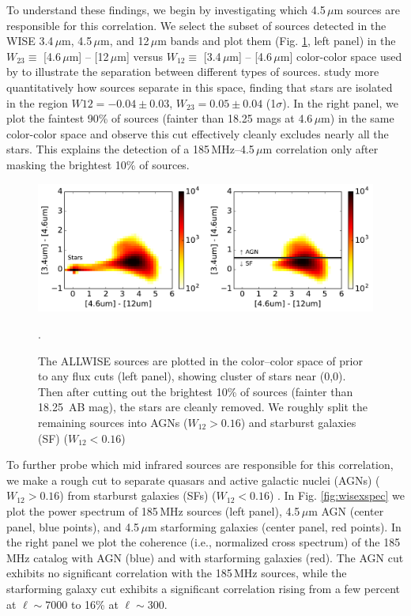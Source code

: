 \documentclass{emulateapj}
\begin{document}
To understand these findings, we begin by investigating which 4.5\,$\mu$m sources are responsible for this correlation. We select the subset of sources detected in the WISE 3.4\,$\mu$m, 4.5\,$\mu$m, and 12\,$\mu$m bands and plot them (Fig. \ref{fig:wisecolorcolor}, left panel) in the $W_{23}\equiv$ [4.6\,$\mu$m] -- [12\,$\mu$m] versus $W_{12}\equiv$ [3.4\,$\mu$m] -- [4.6\,$\mu$m] color-color space used by \citet{Wright2010} to illustrate the separation between different types of sources. \citet{nikutta14} study more quantitatively how sources separate in this space, finding that stars are isolated in the region $W{12}=-0.04\pm0.03$, $W_{23}=0.05\pm0.04$ (1$\sigma$). In the right panel, we plot the faintest 90\% of sources (fainter than 18.25 mags at 4.6\,$\mu$m) in the same color-color space and observe this cut effectively cleanly excludes nearly all the stars. This explains the detection of a 185\,MHz--4.5\,$\mu$m correlation only after masking the brightest 10\% of sources. 

\begin{figure}[h]
\centering
\includegraphics[width=6in]{images/wise_color_color_figure_max=1e-3_5Jy.pdf}
\caption{The ALLWISE sources are plotted in the color--color space of \citet{Wright2010} prior to any flux cuts (left panel), showing cluster of stars near (0,0). Then after cutting out the brightest 10\% of sources (fainter than 18.25\, AB mag), the stars are cleanly removed. We roughly split the remaining sources into AGNs ($W_{12}>0.16$) and starburst galaxies (SF) ($W_{12}<0.16$) \citep{nikutta14,kurcz16}}.
\label{fig:wisecolorcolor}
\end{figure}

To further probe which mid infrared sources are responsible for this correlation, we make a rough cut to separate quasars and active galactic nuclei (AGNs) ($W_{12}>0.16$) from starburst galaxies (SFs) ($W_{12}<0.16$) \citep{nikutta14,kurcz16}. In Fig. \ref{fig:wisexspec} we plot the power spectrum of 185\,MHz sources (left panel), 4.5\,$\mu$m AGN (center panel, blue points), and 4.5\,$\mu$m starforming galaxies (center panel, red points). In the right panel we plot the coherence (i.e., normalized cross spectrum) of the 185\,MHz catalog with AGN (blue) and with starforming galaxies (red). The AGN cut exhibits no significant correlation with the 185\,MHz sources, while the starforming galaxy cut exhibits a significant correlation rising from a few percent at $\ell\sim7000$ to 16\% at $\ell\sim300$. 
\end{document}

